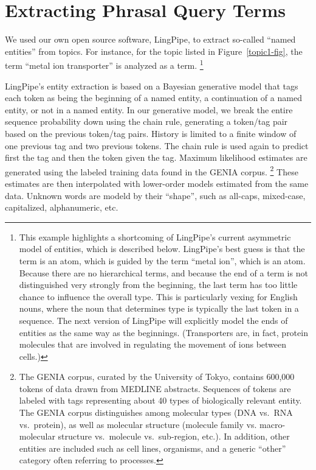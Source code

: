 \documentclass[11pt,oneside]{article}
\begin{document}
\section*{Extracting Phrasal Query Terms}

We used our own open source software, LingPipe, to extract so-called
``named entities'' from topics.  For instance, for the topic listed in
Figure~\ref{topic1-fig}, the term ``metal ion transporter'' is
analyzed as a term.%
%
\footnote{This example highlights a shortcoming of 
LingPipe's current asymmetric model of entities, which is described
below.  LingPipe's best guess is that the term is an atom, which is
guided by the term ``metal ion'', which is an atom.  Because there are
no hierarchical terms, and because the end of a term is not
distinguished very strongly from the beginning, the last term has too
little chance to influence the overall type.  This is particularly
vexing for English nouns, where the noun that determines type is
typically the last token in a sequence.  The next version of LingPipe will
explicitly model the ends of entities as the same way as the
beginnings.  (Transporters are, in fact, protein molecules that are
involved in regulating the movement of ions between cells.)}

LingPipe's entity extraction is based on a Bayesian generative model
that tags each token as being the beginning of a named entity, a
continuation of a named entity, or not in a named entity.  In our
generative model, we break the entire sequence probability down using
the chain rule, generating a token/tag pair based on the previous
token/tag pairs.  History is limited to a finite window of one
previous tag and two previous tokens.  The chain rule is used again to
predict first the tag and then the token given the tag.  Maximum
likelihood estimates are generated using the labeled training data
found in the GENIA corpus.%
\footnote{The GENIA corpus, curated by the University of
Tokyo, contains 600,000 tokens of data drawn from
MEDLINE abstracts.  Sequences of tokens are labeled with tags
representing about 40 types of biologically relevant entity.  The
GENIA corpus distinguishes among molecular types (DNA vs.\ RNA vs.\
protein), as well as molecular structure (molecule family
vs. macro-molecular structure vs.\ molecule vs.\ sub-region, etc.).
In addition, other entities are included such as cell lines,
organisms, and a generic ``other'' category often referring to
processes.}
%
These estimates are then interpolated with lower-order models
estimated from the same data.  Unknown words are modeld by
their ``shape'', such as all-caps, mixed-case, capitalized,
alphanumeric, etc.
\end{document}
